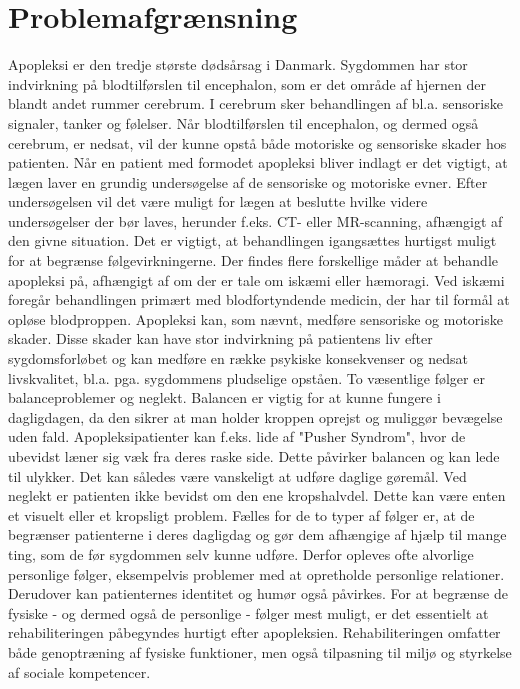 \section{Problemafgrænsning}
Apopleksi er den tredje største dødsårsag i Danmark. 
Sygdommen har stor indvirkning på blodtilførslen til encephalon, som er det område af hjernen der blandt andet rummer cerebrum. I cerebrum sker behandlingen af bl.a. sensoriske signaler, tanker og følelser. Når blodtilførslen til encephalon, og dermed også cerebrum, er nedsat, vil der kunne opstå både motoriske og sensoriske skader hos patienten. 
Når en patient med formodet apopleksi bliver indlagt er det vigtigt, at lægen laver en grundig undersøgelse af de sensoriske og motoriske evner. Efter undersøgelsen vil det være muligt for lægen at beslutte hvilke videre undersøgelser der bør laves, herunder f.eks. CT- eller MR-scanning, afhængigt af den givne situation. Det er vigtigt, at behandlingen igangsættes hurtigst muligt for at begrænse følgevirkningerne. Der findes flere forskellige måder at behandle apopleksi på, afhængigt af om der er tale om iskæmi eller hæmoragi. Ved iskæmi foregår behandlingen primært med blodfortyndende medicin, der har til formål at opløse blodproppen. 
Apopleksi kan, som nævnt, medføre sensoriske og motoriske skader. Disse skader kan have stor indvirkning på patientens liv efter sygdomsforløbet og kan medføre en række psykiske konsekvenser og nedsat livskvalitet, bl.a. pga. sygdommens pludselige opståen.
To væsentlige følger er balanceproblemer og neglekt. Balancen er vigtig for at kunne fungere i dagligdagen, da den sikrer at man holder kroppen oprejst og muliggør bevægelse uden fald. Apopleksipatienter kan f.eks. lide af "Pusher Syndrom", hvor de ubevidst læner sig væk fra deres raske side. Dette påvirker balancen og kan lede til ulykker. Det kan således være vanskeligt at udføre daglige gøremål. Ved neglekt er patienten ikke bevidst om den ene kropshalvdel. Dette kan være enten et visuelt eller et kropsligt problem.
Fælles for de to typer af følger er, at de begrænser patienterne i deres dagligdag og gør dem afhængige af hjælp til mange ting, som de før sygdommen selv kunne udføre. Derfor opleves ofte alvorlige personlige følger, eksempelvis problemer med at opretholde personlige relationer. Derudover kan patienternes identitet og humør også påvirkes. 
For at begrænse de fysiske - og dermed også de personlige - følger mest muligt, er det essentielt at rehabiliteringen påbegyndes hurtigt efter apopleksien. Rehabiliteringen omfatter både genoptræning af fysiske funktioner, men også tilpasning til miljø og styrkelse af sociale kompetencer. 
